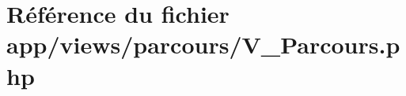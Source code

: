 \hypertarget{_v___parcours_8php}{}\section{Référence du fichier app/views/parcours/\+V\+\_\+\+Parcours.php}
\label{_v___parcours_8php}
